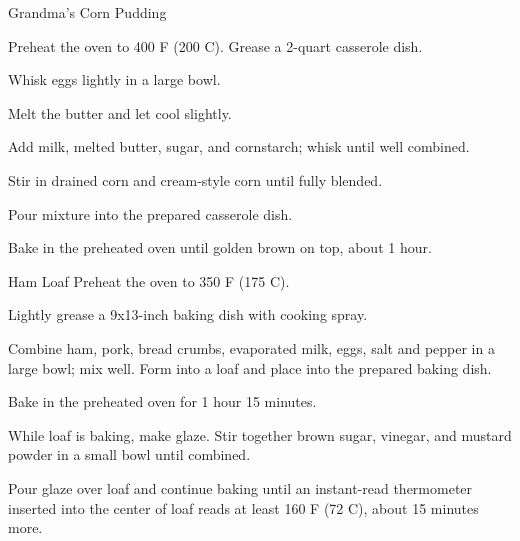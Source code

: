 \documentclass[letterpaper]{book}
\begin{document}
\begin{recipe}{Grandma's Corn Pudding}{}{}

    \newstep
    Preheat the oven to 400\0 F (200\0 C). Grease a 2-quart casserole dish.

    Whisk eggs lightly in a large bowl.

    Melt the butter and let cool slightly.

    Add milk, melted butter, sugar, and cornstarch; whisk until well combined.

    Stir in drained corn and cream-style corn until fully blended.

    \newstep
    Pour mixture into the prepared casserole dish.

    \newstep
    Bake in the preheated oven until golden brown on top, about 1 hour.
\end{recipe}

\begin{recipe}{Ham Loaf}{}{}
    \newstep
    Preheat the oven to 350\0 F (175\0 C).

    Lightly grease a 9x13-inch baking dish with cooking spray.

    Combine ham, pork, bread crumbs, evaporated milk, eggs, salt and pepper in a large bowl; mix well.
    Form into a loaf and place into the prepared baking dish.

    \newstep
    Bake in the preheated oven for 1 hour 15 minutes.

    While loaf is baking, make glaze.
    Stir together brown sugar, vinegar, and mustard powder in a small bowl until combined.

    \newstep
    Pour glaze over loaf and continue baking until an instant-read thermometer inserted into the center of loaf reads at least 160\0 F (72\0 C), about 15 minutes more.
\end{recipe}
\end{document}
